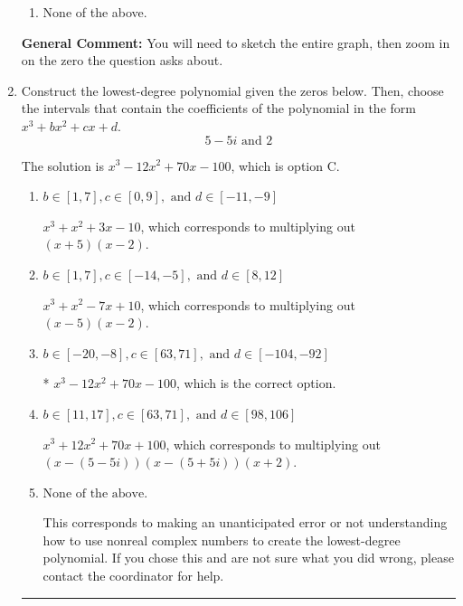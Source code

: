 \documentclass{extbook}[14pt]
\newcommand{\litem}[1]{\item #1

\rule{\textwidth}{0.4pt}}
\begin{document}
\begin{enumerate}
{\begin{enumerate}[label=\Alph*.]
\item None of the above.\end{enumerate}
\textbf{General Comment:} You will need to sketch the entire graph, then zoom in on the zero the question asks about.
}
\litem{
Construct the lowest-degree polynomial given the zeros below. Then, choose the intervals that contain the coefficients of the polynomial in the form $x^3+bx^2+cx+d$.
\[ 5 - 5 i \text{ and } 2 \]

The solution is \( x^{3} -12 x^{2} +70 x -100 \), which is option C.\begin{enumerate}[label=\Alph*.]
\item \( b \in [1, 7], c \in [0, 9], \text{ and } d \in [-11, -9] \)

$x^{3} + x^{2} +3 x -10$, which corresponds to multiplying out $(x + 5)(x -2)$.
\item \( b \in [1, 7], c \in [-14, -5], \text{ and } d \in [8, 12] \)

$x^{3} + x^{2} -7 x + 10$, which corresponds to multiplying out $(x -5)(x -2)$.
\item \( b \in [-20, -8], c \in [63, 71], \text{ and } d \in [-104, -92] \)

* $x^{3} -12 x^{2} +70 x -100$, which is the correct option.
\item \( b \in [11, 17], c \in [63, 71], \text{ and } d \in [98, 106] \)

$x^{3} +12 x^{2} +70 x + 100$, which corresponds to multiplying out $(x-(5 - 5 i))(x-(5 + 5 i))(x + 2)$.
\item \( \text{None of the above.} \)

This corresponds to making an unanticipated error or not understanding how to use nonreal complex numbers to create the lowest-degree polynomial. If you chose this and are not sure what you did wrong, please contact the coordinator for help.
\end{enumerate}

}
\end{enumerate}
\end{document}
